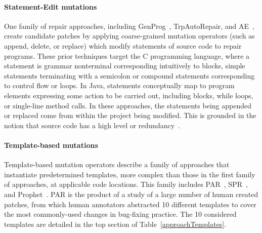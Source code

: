 \documentclass[conference]{IEEEtran}
\begin{document}
\paragraph{Statement-Edit mutations}
One family of repair approaches, including GenProg~\cite{legoues12}, 
TrpAutoRepair\cite{Qi13TrpAutoR}, and AE~\cite{Weimer13},
create candidate 
patches by applying coarse-grained mutation operators (such as append, delete, or 
replace) which modify statements of source code to 
repair programs. These prior techniques target the C programming language, where
a statement is grammar nonterminal corresponding intuitively to blocks,
simple statements terminating
with a semicolon or compound statements corresponding to control flow or
loops. In Java, statements conceptually map to program elements expressing
some action to be carried out, including blocks,  while loops, or single-line
method calls. In these approaches, the statements being appended or replaced come from within the project being modified. This is grounded in the notion that source code has a high level or redundancy~\cite{gabel10}.

\paragraph{Template-based mutations}
Template-based mutation operators describe a family of approaches that instantiate
predetermined templates, more complex than those in the first family of
approaches, at applicable code locations.  This family includes PAR~\cite{kim2013}, 
SPR~\cite{fan15SPR}, and 
Prophet~\cite{long16proph}.
%
PAR is the product of a study of a large number of 
human 
created patches, from which human annotators abstracted 10 different templates to cover
the most commonly-used changes in bug-fixing practice.
The 10 considered templates are detailed in the top section of Table~\ref{approachTemplates}.
\end{document}
